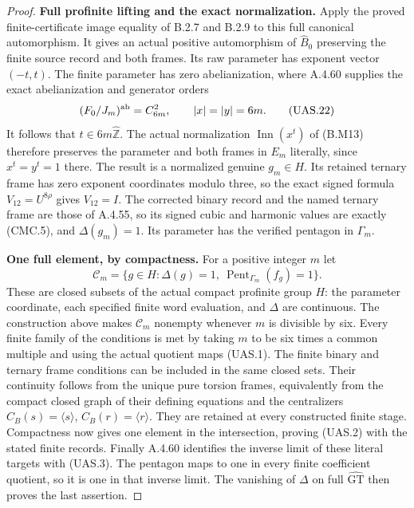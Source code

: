 \begin{proof}
\par\medskip\noindent\textbf{Full profinite lifting and the exact normalization.}\quad
Apply the proved finite-certificate image equality of B.2.7 and
B.2.9 to this full canonical automorphism.  It gives an actual
positive automorphism of $\widehat B_0$ preserving the finite
source record and both frames.  Its raw parameter has exponent
vector $(-t,t)$.  The finite parameter has zero abelianization,
where A.4.60 supplies the exact abelianization and generator orders
\[
        (F_0/J_m)^{\rm ab}=C_{6m}^2,
             \qquad |x|=|y|=6m.
                                                                    \tag{UAS.22}
\]
It follows that $t\in6m\widehat{\mathbb Z}$.
The actual normalization $\operatorname{Inn}(x^t)$ of (B.M13)
therefore preserves the parameter and both frames in $E_m$
literally, since $x^t=y^t=1$ there.
The result is a normalized genuine $g_m\in H$.
Its retained ternary frame has zero exponent coordinates modulo
three, so the exact signed formula $V_{12}=U^{8\rho}$ gives
$V_{12}=I$.  The corrected binary record and the named ternary
frame are those of A.4.55, so its signed cubic and harmonic
values are exactly (CMC.5), and $\Delta(g_m)=1$.
Its parameter has the verified pentagon in $\Gamma_m$.

\par\medskip\noindent\textbf{One full element, by compactness.}\quad
For a positive integer $m$ let
\[
 \mathcal C_m=\{g\in H:\Delta(g)=1,
                         \ \operatorname{Pent}_{\Gamma_m}(f_g)=1\}.
                                                                    \tag{UAS.23}
\]
These are closed subsets of the actual compact profinite group
$H$: the parameter coordinate, each specified finite word
evaluation, and $\Delta$ are continuous.
The construction above makes $\mathcal C_m$ nonempty whenever
$m$ is divisible by six.  Every finite family of the conditions
is met by taking $m$ to be six times a common multiple and using
the actual quotient maps (UAS.1).
The finite binary and ternary frame conditions can be included
in the same closed sets.  Their continuity follows from the
unique pure torsion frames, equivalently from the compact closed
graph of their defining equations and the centralizers
$C_B(s)=\langle s\rangle$, $C_B(r)=\langle r\rangle$.
They are retained at every constructed finite stage.
Compactness now gives one element in the intersection, proving
(UAS.2) with the stated finite records.
Finally A.4.60 identifies the inverse limit of these literal
targets with (UAS.3).  The pentagon maps to one in every finite
coefficient quotient, so it is one in that inverse limit.
The vanishing of $\Delta$ on full $\widehat{\mathrm{GT}}$
then proves the last assertion.
\end{proof}


